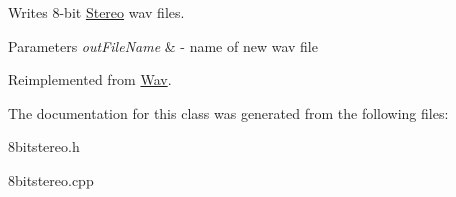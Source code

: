 Writes 8-\/bit \hyperlink{classStereo}{Stereo} wav files.


\begin{DoxyParams}{Parameters}
{\em out\+File\+Name} & -\/ name of new wav file \\
\hline
\end{DoxyParams}


Reimplemented from \hyperlink{classWav_a7bae34f37288c53cb113e76045f78098}{Wav}.



The documentation for this class was generated from the following files\+:\begin{DoxyCompactItemize}
\item 
8bitstereo.\+h\item 
8bitstereo.\+cpp\end{DoxyCompactItemize}
